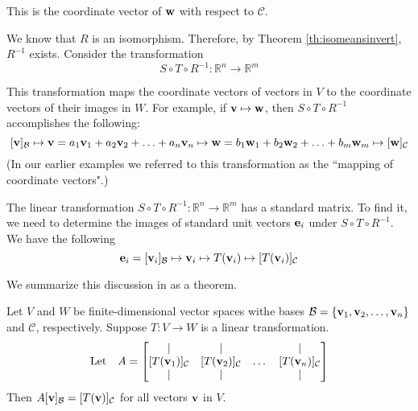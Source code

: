 \documentclass{ximera}
\renewcommand{\vec}[1]{{\bf #1}}
\newcommand{\RR}{\mathbb{R}}
\begin{document}
This is the coordinate vector of $\vec{w}$ with respect to $\mathcal{C}$.

We know that $R$ is an isomorphism.  Therefore, by Theorem \ref{th:isomeansinvert}, $R^{-1}$ exists. Consider the transformation
$$S\circ T\circ R^{-1}:\RR^n\rightarrow \RR^m$$

\begin{center}
\end{center}

This transformation maps the coordinate vectors of vectors in $V$ to the coordinate vectors of their images in $W$.  For example, if $\vec{v}\mapsto\vec{w}$, then $S\circ T\circ R^{-1}$ accomplishes the following:
$$[\vec{v}]_{\mathcal{B}}\mapsto\vec{v}=a_1\vec{v}_1+a_2\vec{v}_2+\ldots +a_n\vec{v}_n\mapsto\vec{w}=b_1\vec{w}_1+b_2\vec{w}_2+\ldots +b_m\vec{w}_m\mapsto[\vec{w}]_{\mathcal{C}}$$
(In our earlier examples we referred to this transformation as the ``mapping of coordinate vectors".)

The linear transformation $S\circ T\circ R^{-1}:\RR^n\rightarrow \RR^m$ has a standard matrix.  To find it, we need to determine the images of standard unit vectors $\vec{e}_i$ under $S\circ T\circ R^{-1}$. We have the following
$$\vec{e}_i=[\vec{v}_i]_{\mathcal{B}}\mapsto \vec{v}_i \mapsto T(\vec{v}_i)\mapsto [T(\vec{v}_i)]_{\mathcal{C}}$$

We summarize this discussion in as a theorem.

\begin{theorem}\label{th:matlintransgeneral}
Let $V$ and $W$ be finite-dimensional vector spaces withe bases $\mathcal{B}=\{\vec{v}_1,\vec{v}_2,\ldots,\vec{v}_n\}$ and $\mathcal{C}$, respectively.  Suppose $T:V\rightarrow W$ is a linear transformation.  
$$\text{Let}\quad A=\begin{bmatrix}
           | & |& &|\\
		[T(\vec{v}_1)]_{\mathcal{C}} & [T(\vec{v}_2)]_{\mathcal{C}}&\dots &[T(\vec{v}_n)]_{\mathcal{C}}\\
		|&| & &|
         \end{bmatrix}$$
Then $A[\vec{v}]_{\mathcal{B}}=[T(\vec{v})]_{\mathcal{C}}$ for all vectors $\vec{v}$ in $V$.       
\end{theorem}
\end{document}
